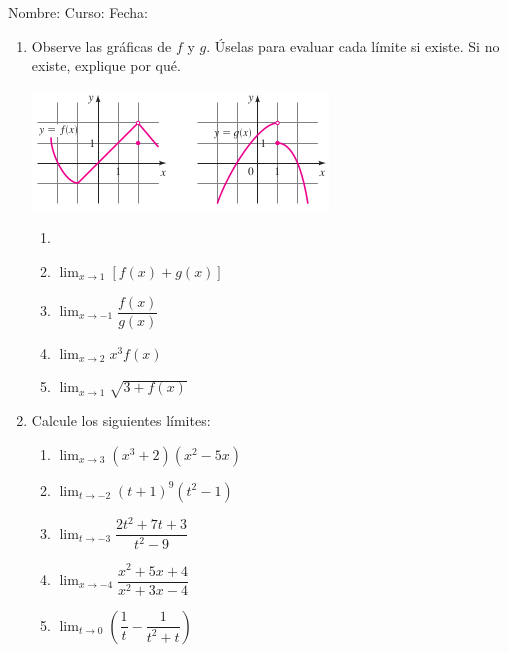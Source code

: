 \documentclass[letterpaper,fleqn]{article}
\newcommand{\LineaNombre}{%
\par
\vspace{\baselineskip}
Nombre:\hrulefill \; Curso: \underline{\hspace*{48pt}} \; Fecha: \underline{\hspace*{2.5cm}} \relax
\par}
\begin{document}
\LineaNombre
\begin{enumerate}
 \item Observe las gráficas de $f$ y $g$. Úselas para evaluar cada límite si existe. Si no existe, explique por qué.
\begin{center}
\includegraphics[scale=.8]{Images/funciones_fyg.png} 
\end{center}
\begin{enumerate}
\item \item $\displaystyle{\lim_{x\rightarrow 1}}[f(x)+g(x)]$\noanswer
\item $\displaystyle{\lim_{x\rightarrow -1}}\dfrac{f(x)}{g(x)}$\noanswer
\item $\displaystyle{\lim_{x\rightarrow 2}}x^{3}f(x)$\noanswer
\item $\displaystyle{\lim_{x\rightarrow 1}}\sqrt{3+f(x)}$\noanswer
\end{enumerate}
\item Calcule los siguientes límites:
\begin{enumerate}
\item $\displaystyle{\lim_{x\rightarrow 3}}(x^{3}+2)(x^{2}-5x)$ \noanswer
\newpage
\item $\displaystyle{\lim_{t\rightarrow -2}}(t+1)^{9}(t^{2}-1)$\noanswer
\item $\displaystyle{\lim_{t\rightarrow -3}}\dfrac{2t^{2}+7t+3}{t^{2}-9}$\noanswer
\item $\displaystyle{\lim_{x\rightarrow -4}}\dfrac{x^{2}+5x+4}{x^{2}+3x-4}$\noanswer
\item $\displaystyle{\lim_{t\rightarrow 0}}\left(\dfrac{1}{t}-\dfrac{1}{t^{2}+t}\right)$\noanswer
\end{enumerate}
 \end{enumerate}
\end{document}
